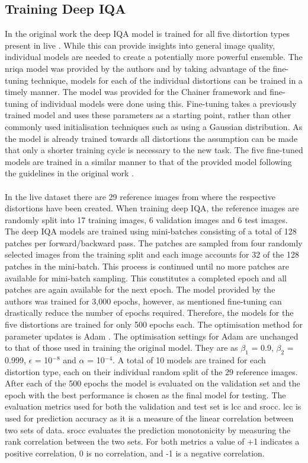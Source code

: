 \subsection{Training Deep IQA}
In the original work the deep IQA model \cite{deepiqa} is trained for all five distortion types present in \gls{live} \cite{livepaper} \cite{liveweb}. While this can provide insights into general image quality, individual models are needed to create a potentially more powerful ensemble. The \gls{nriqa} model was provided by the authors and by taking advantage of the fine-tuning technique, models for each of the individual distortions can be trained in a timely manner. The model was provided for the Chainer framework \cite{chainer} and fine-tuning of individual models were done using this. Fine-tuning takes a previously trained model and uses these parameters as a starting point, rather than other commonly used initialisation techniques such as using a Gaussian distribution. As the model is already trained towards all distortions the assumption can be made that only a shorter training cycle is necessary to the new task. The five fine-tuned models are trained in a similar manner to that of the provided model following the guidelines in the original work \cite{deepiqa}. 
\\\\
In the \gls{live} dataset there are 29 reference images from where the respective distortions have been created. When training deep IQA, the reference images are randomly split into 17 training images, 6 validation images and 6 test images. The deep IQA models are trained using mini-batches consisting of a total of 128 patches per forward/backward pass. The patches are sampled from four randomly selected images from the training split and each image accounts for 32 of the 128 patches in the mini-batch. This process is continued until no more patches are available for mini-batch sampling. This constitutes a completed epoch and all patches are again available for the next epoch. The model provided by the authors was trained for 3,000 epochs, however, as mentioned fine-tuning can drastically reduce the number of epochs required. Therefore, the models for the five distortions are trained for only 500 epochs each. The optimisation method for parameter updates is Adam \cite{adam}. The optimisation settings for Adam are unchanged to that of those used in training the original model. They are as $\beta_1$ = 0.9, $\beta_2$ = 0.999, $\epsilon$ = 10$^{-8}$ and $\alpha$ = 10$^{-4}$. A total of 10 models are trained for each distortion type, each on their individual random split of the 29 reference images. After each of the 500 epochs the model is evaluated on the validation set and the epoch with the best performance is chosen as the final model for testing. The evaluation metrics used for both the validation and test set is \gls{lcc} and \gls{srocc}. \gls{lcc} is used for prediction accuracy as it is a measure of the linear correlation between two sets of data. \gls{srocc} evaluates the prediction monotonicity by measuring the rank correlation between the two sets. For both metrics a value of +1 indicates a positive correlation, 0 is no correlation, and -1 is a negative correlation.
